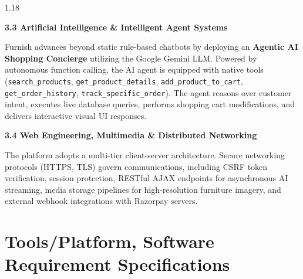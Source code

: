 \documentclass[12pt,a4paper]{article}
\begin{document}
{\begin{spacing}{1.18}
\vspace{0.4in}

\noindent
\textbf{3.3 Artificial Intelligence \& Intelligent Agent Systems}

\vspace{0.04in}

\noindent
Furnish advances beyond static rule-based chatbots by deploying an \textbf{Agentic AI Shopping Concierge} utilizing the Google Gemini LLM. Powered by autonomous function calling, the AI agent is equipped with native tools (\texttt{search\_products}, \texttt{get\_product\_details}, \texttt{add\_product\_to\_cart}, \texttt{get\_order\_history}, \texttt{track\_specific\_order}). The agent reasons over customer intent, executes live database queries, performs shopping cart modifications, and delivers interactive visual UI responses.

\vspace{0.4in}

\noindent
\textbf{3.4 Web Engineering, Multimedia \& Distributed Networking}

\vspace{0.04in}

\noindent
The platform adopts a multi-tier client-server architecture. Secure networking protocols (HTTPS, TLS) govern communications, including CSRF token verification, session protection, RESTful AJAX endpoints for asynchronous AI streaming, media storage pipelines for high-resolution furniture imagery, and external webhook integrations with Razorpay servers.

\end{spacing}
}

\vfill

\newpage




\section{Tools/Platform, Software Requirement Specifications}

\vspace{0.10in}
\end{document}

